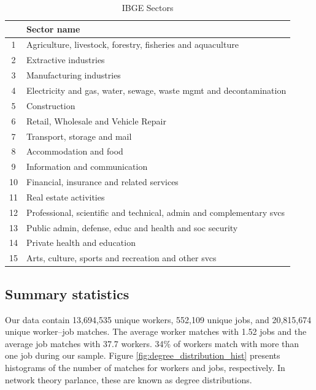 \documentclass[12pt]{article}
\theoremstyle{definition}
\theoremstyle{plain}
\begin{document}
\begin{table}
	\centering
	\caption{IBGE Sectors}
	\begin{tabular}{cl}
		\toprule
		& Sector name \\
		\midrule
		1	& Agriculture, livestock, forestry, fisheries and aquaculture  \\
		2	& Extractive industries  \\
		3	& Manufacturing industries  \\
		4	& Electricity and gas, water, sewage, waste mgmt and decontamination  \\
		5	& Construction  \\
		6	& Retail, Wholesale and Vehicle Repair  \\
		7	& Transport, storage and mail  \\
		8	& Accommodation and food  \\
		9	& Information and communication  \\
		10	& Financial, insurance and related services  \\
		11	& Real estate activities  \\
		12	& Professional, scientific and technical, admin and complementary svcs  \\
		13	& Public admin, defense, educ and health and soc security  \\
		14	& Private health and education  \\
		15	& Arts, culture, sports and recreation and other svcs \\
		\bottomrule
	\end{tabular}
	\label{table:IBGE_sectors}
\end{table}


\subsection{Summary statistics}



Our data contain 13,694,535 unique workers, 552,109 unique jobs, and 20,815,674 unique worker--job matches. The average worker matches with 1.52 jobs and the average job matches with 37.7 workers. 34\% of workers match with more than one job during our sample. Figure \ref{fig:degree_distribution_hist} presents histograms of the number of matches for workers and jobs, respectively. In network theory parlance, these are known as degree distributions. 
\end{document}
